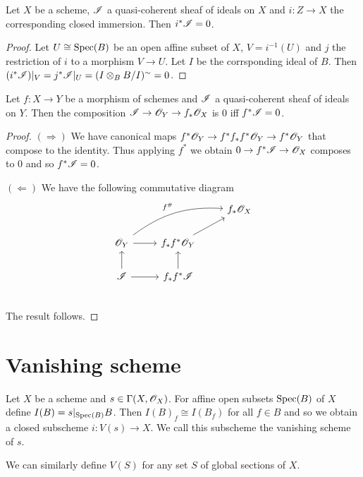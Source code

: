 \documentclass{memoir}
\begin{document}
\begin{proposition}
    Let $X$ be a scheme, $\mathscr{I}$ a quasi-coherent sheaf of ideals on $X$ and $i:Z\to X$ the corresponding closed immersion.
    Then $i^*\mathscr{I} = 0$.
\end{proposition}
\begin{proof}
    Let $U \cong \operatorname{Spec}(B)$ be an open affine subset of $X$, $V = i^{-1}(U)$ and $j$ the restriction of $i$ to a morphism $V\to U$.
    Let $I$ be the corrsponding ideal of $B$.
    Then $(i^*\mathscr{I})|_V = j^*\mathscr{I}|_U = (I\otimes_BB/I)^\sim = 0$.
\end{proof}
\begin{proposition}
    Let $f:X\to Y$ be a morphism of schemes and $\mathscr{I}$ a quasi-coherent sheaf of ideals on $Y$.
    Then the composition $\mathscr{I}\to \mathscr{O}_Y\to f_*\mathscr{O}_X$ is $0$ iff $f^*\mathscr{I} = 0$.
\end{proposition}
\begin{proof}
    $(\Rightarrow)$ We have canonical maps $f^*\mathscr{O}_Y\to f^*f_*f^*\mathscr{O}_Y\to f^*\mathscr{O}_Y$ that compose to the identity.
    Thus applying $f^*$ we obtain $0\to f^*\mathscr{I} \to \mathscr{O}_X$ composes to $0$ and so $f^*\mathscr{I} = 0$.

    $(\Leftarrow)$ We have the following commutative diagram
    \begin{equation}
        \begin{tikzcd}
            & & f_*\shf O_X \\
            \shf O_Y \arrow[r] \arrow[urr,bend left=20,"f^\#"] & f_*f^*\shf O_Y \arrow[ur] \\
            \shf I \arrow[r] \arrow[u] & f_*f^*\shf I \arrow[u] \\
        \end{tikzcd}
    \end{equation}
    The result follows.
\end{proof}
\section{Vanishing scheme}
\begin{definition}
    Let $X$ be a scheme and $s\in \Gamma(X,\mathscr{O}_X)$.
    For affine open subsets $\operatorname{Spec}(B)$ of $X$ define $I(B) = s|_{\operatorname{Spec}(B)}B$.
    Then $I(B)_f\cong I(B_f)$ for all $f\in B$ and so we obtain a closed subscheme $i:V(s)\to X$.
    We call this subscheme the vanishing scheme of $s$.
    
    We can similarly define $V(S)$ for any set $S$ of global sections of $X$.
\end{definition}
\end{document}
